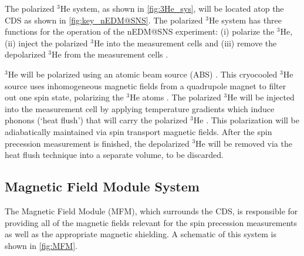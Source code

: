 The polarized $^3$He system, as shown in \cref{fig:3He_sys}, will be located atop the CDS as shown in \cref{fig:key_nEDM@SNS}. The polarized $^3$He system has three functions for the operation of the nEDM@SNS experiment: (i) polarize the $^3$He, (ii) inject the polarized $^3$He into the measurement cells and (iii) remove the depolarized $^3$He from the measurement cells \cite{Ahmed2019}.

$^3$He will be polarized using an atomic beam source (ABS) \cite{Esler2007, Eckel2012}. This cryocooled $^3$He source uses inhomogeneous magnetic fields from a quadrupole magnet to filter out one spin state, polarizing the $^3$He atoms \cite{Ahmed2019}. The polarized $^3$He will be injected into the measurement cell by applying temperature gradients which induce phonons (‘heat flush’) that will carry the polarized $^3$He \cite{Baym2015}. This polarization will be adiabatically maintained via spin transport magnetic fields. After the spin precession measurement is finished, the depolarized $^3$He will be removed via the heat flush technique into a separate volume, to be discarded. 


\subsection{Magnetic Field Module System}

The Magnetic Field Module (MFM), which surrounds the CDS, is responsible for providing all of the magnetic fields relevant for the spin precession measurements as well as the appropriate magnetic shielding. A schematic of this system is shown in \cref{fig:MFM}. 

